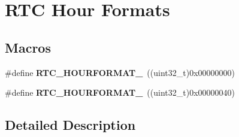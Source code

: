 \hypertarget{group___r_t_c___hour___formats}{}\section{R\+TC Hour Formats}
\label{group___r_t_c___hour___formats}
\subsection*{Macros}
\begin{DoxyCompactItemize}
\item 
\#define {\bfseries R\+T\+C\+\_\+\+H\+O\+U\+R\+F\+O\+R\+M\+A\+T\+\_}~((uint32\+\_\+t)0x00000000)\hypertarget{group___r_t_c___hour___formats_gab1a861fd858a55a6e815be4585c413d5}{}\label{group___r_t_c___hour___formats_gab1a861fd858a55a6e815be4585c413d5}

\item 
\#define {\bfseries R\+T\+C\+\_\+\+H\+O\+U\+R\+F\+O\+R\+M\+A\+T\+\_}~((uint32\+\_\+t)0x00000040)\hypertarget{group___r_t_c___hour___formats_ga8da8ecb55e286c410dbf1297a81125ae}{}\label{group___r_t_c___hour___formats_ga8da8ecb55e286c410dbf1297a81125ae}

\end{DoxyCompactItemize}


\subsection{Detailed Description}
